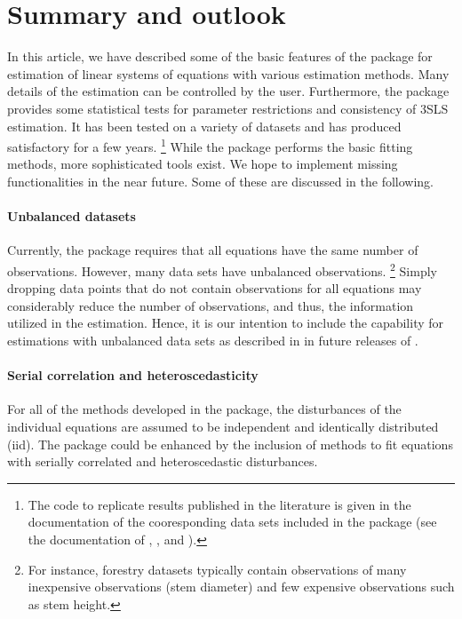 

\section{Summary and outlook}\label{sec:Summmary}

In this article, we have described some of the basic features of the
 package for estimation of linear systems of
equations with various estimation methods.
Many details of the estimation can be controlled by the user.
Furthermore, the package provides some statistical tests
for parameter restrictions and consistency of 3SLS estimation.
It has been tested on a variety of datasets and has produced satisfactory
for a few years.%
\footnote{
The code to replicate results published in the literature is given
in the documentation of the cooresponding data sets
included in the  package
(see the documentation of , ,
 and ).
}
While the  package performs the basic fitting methods,
more sophisticated tools exist.
We hope to implement missing functionalities
in the near future.
Some of these are discussed in the following.

\paragraph{Unbalanced datasets}
Currently, the  package requires
that all equations have the same number of observations.
However, many data sets have unbalanced observations.%
\footnote{
For instance,
forestry datasets typically contain observations of many inexpensive
observations (stem diameter) and few expensive observations such
as stem height.
}
Simply dropping data points
that do not contain observations for all equations
may considerably reduce the number of observations,
and thus, the information utilized in the estimation.
Hence, it is our intention to include the capability for estimations
with unbalanced data sets as described in \citet{schmidt77}
in future releases of .

\paragraph{Serial correlation and heteroscedasticity}
For all of the methods developed in the package, the disturbances of
the individual equations are assumed to be independent and identically
distributed (iid).
The package could be enhanced by the inclusion of methods to fit
equations with serially correlated and heteroscedastic disturbances.

